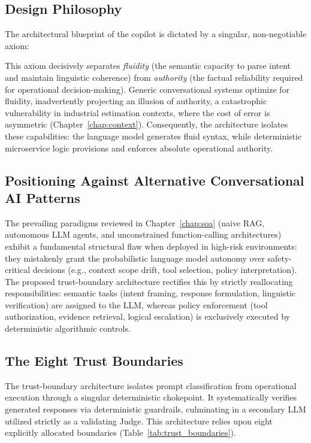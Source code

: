 \subsection{Design Philosophy}
The architectural blueprint of the copilot is dictated by a singular, non-negotiable axiom:
\begin{center}
\end{center}
This axiom decisively separates \textit{fluidity} (the semantic capacity to parse intent and maintain linguistic coherence) from \textit{authority} (the factual reliability required for operational decision-making). Generic conversational systems optimize for fluidity, inadvertently projecting an illusion of authority, a catastrophic vulnerability in industrial estimation contexts, where the cost of error is asymmetric (Chapter~\ref{chap:context}). Consequently, the architecture isolates these capabilities: the language model generates fluid syntax, while deterministic microservice logic provisions and enforces absolute operational authority.

\subsection{Positioning Against Alternative Conversational AI Patterns}
The prevailing paradigms reviewed in Chapter~\ref{chap:soa} (naive RAG, autonomous LLM agents, and unconstrained function-calling architectures) exhibit a fundamental structural flaw when deployed in high-risk environments: they mistakenly grant the probabilistic language model autonomy over safety-critical decisions (e.g., context scope drift, tool selection, policy interpretation). The proposed trust-boundary architecture rectifies this by strictly reallocating responsibilities: semantic tasks (intent framing, response formulation, linguistic verification) are assigned to the LLM, whereas policy enforcement (tool authorization, evidence retrieval, logical escalation) is exclusively executed by deterministic algorithmic controls.

\subsection{The Eight Trust Boundaries}
The trust-boundary architecture isolates prompt classification from operational execution through a singular deterministic chokepoint. It systematically verifies generated responses via deterministic guardrails, culminating in a secondary LLM utilized strictly as a validating Judge. This architecture relies upon eight explicitly allocated boundaries (Table~\ref{tab:trust_boundaries}).

